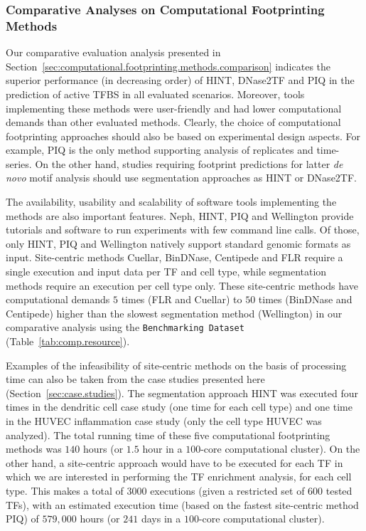 \subsubsection{Comparative Analyses on Computational Footprinting Methods}

Our comparative evaluation analysis presented in Section~\ref{sec:computational.footprinting.methods.comparison} indicates the superior performance (in decreasing order) of HINT, DNase2TF and PIQ in the prediction of active TFBS in all evaluated scenarios. Moreover, tools implementing these methods were user-friendly and had lower computational demands than other evaluated methods. Clearly, the choice of computational footprinting approaches should also be based on experimental design aspects. For example, PIQ is the only method supporting analysis of replicates and time-series. On the other hand, studies requiring footprint predictions for latter \emph{de novo} motif analysis should use segmentation approaches as HINT or DNase2TF.

The availability, usability and scalability of software tools implementing the methods are also important features. Neph, HINT, PIQ and Wellington provide tutorials and software to run experiments with few command line calls. Of those, only HINT, PIQ and Wellington natively support standard genomic formats as input. Site-centric methods Cuellar, BinDNase, Centipede and FLR require a single execution and input data per TF and cell type, while segmentation methods require an execution per cell type only. These site-centric methods have computational demands $5$ times (FLR and Cuellar) to $50$ times (BinDNase and Centipede) higher than the slowest segmentation method (Wellington) in our comparative analysis using the {\tt Benchmarking Dataset} (Table~\ref{tab:comp.resource}).

Examples of the infeasibility of site-centric methods on the basis of processing time can also be taken from the case studies presented here (Section~\ref{sec:case.studies}). The segmentation approach HINT was executed four times in the dendritic cell case study (one time for each cell type) and one time in the HUVEC inflammation case study (only the cell type HUVEC was analyzed). The total running time of these five computational footprinting methods was \approxy$140$ hours (or \approxy$1.5$ hour in a $100$-core computational cluster). On the other hand, a site-centric approach would have to be executed for each TF in which we are interested in performing the TF enrichment analysis, for each cell type. This makes a total of \approxy$3000$ executions (given a restricted set of $600$ tested TFs), with an estimated execution time (based on the fastest site-centric method PIQ) of $579,000$ hours (or $241$ days in a $100$-core computational cluster).

